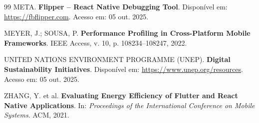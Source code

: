 \documentclass[12pt,a4paper,oneside]{abntex2}
\begin{document}
\begin{thebibliography}{99}
META. \textbf{Flipper – React Native Debugging Tool}. Disponível em: \url{https://fbflipper.com}. Acesso em: 05 out. 2025.

MEYER, J.; SOUSA, P. \textbf{Performance Profiling in Cross-Platform Mobile Frameworks}. IEEE Access, v. 10, p. 108234–108247, 2022.

UNITED NATIONS ENVIRONMENT PROGRAMME (UNEP). \textbf{Digital Sustainability Initiatives}. Disponível em: \url{https://www.unep.org/resources}. Acesso em: 05 out. 2025.

ZHANG, Y. et al. \textbf{Evaluating Energy Efficiency of Flutter and React Native Applications}. In: \textit{Proceedings of the International Conference on Mobile Systems}. ACM, 2021.

\end{thebibliography}
\end{document}
